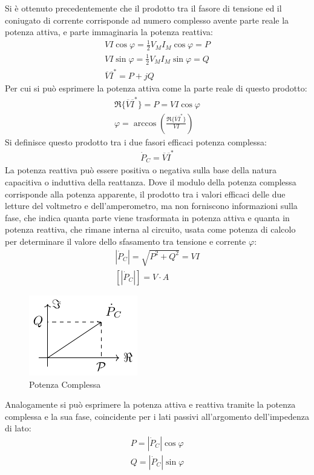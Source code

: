 \documentclass{article}
\numberwithin{equation}{subsection}
\begin{document}
Si è ottenuto precedentemente che il prodotto tra il fasore di tensione ed il coniugato di corrente corrisponde ad numero complesso avente parte reale la potenza attiva, e 
parte immaginaria la potenza reattiva:
\begin{gather*}
    VI\cos\varphi=\displaystyle\frac{1}{2}V_MI_M\cos\varphi=P\\
    VI\sin\varphi=\displaystyle\frac{1}{2}V_MI_M\sin\varphi=Q\\
    \overline{V}\overline{I}^*=P+jQ
\end{gather*}
Per cui si può esprimere la potenza attiva come la parte reale di questo prodotto:
\begin{gather*}
    \Re\{\overline{V}\overline{I}^*\}=P=VI\cos\varphi\\
    \varphi=\arccos\left(\displaystyle\frac{\Re\{\overline{V}\overline{I}^*\}}{VI}\right)
\end{gather*}
Si definisce questo prodotto tra i due fasori efficaci potenza complessa:
\begin{gather*}
    \dot P_C=\overline{V}\overline{I}^*
\end{gather*}
La potenza reattiva può essere positiva o negativa sulla base della natura capacitiva o induttiva della reattanza. 
Dove il modulo della potenza complessa corrisponde alla potenza apparente, il prodotto tra i valori efficaci delle due letture del voltmetro e dell'amperometro, ma non forniscono 
informazioni sulla fase, che indica quanta parte viene trasformata in potenza attiva e quanta in potenza reattiva, che rimane interna al circuito, usata come potenza di 
calcolo per determinare il valore dello sfasamento tra tensione e corrente $\varphi$: 
\begin{gather*}
    |\dot P_C|=\displaystyle\sqrt{P^2+Q^2}=VI\\
    \left[|\dot P_C|\right]=V\cdot A
\end{gather*}
\begin{figure}[ht]%
    \centering
    \includegraphics{potenza-complessa.pdf}
    \caption{Potenza Complessa}
    \label{fig:potenza-complessa}
\end{figure}
Analogamente si può esprimere la potenza attiva e reattiva tramite la potenza complessa e la sua fase, coincidente per i lati passivi all'argomento dell'impedenza di lato:
\begin{gather*}
    P=|\dot P_C|\cos\varphi\\
    Q=|\dot P_C|\sin\varphi
\end{gather*}
\end{document}
